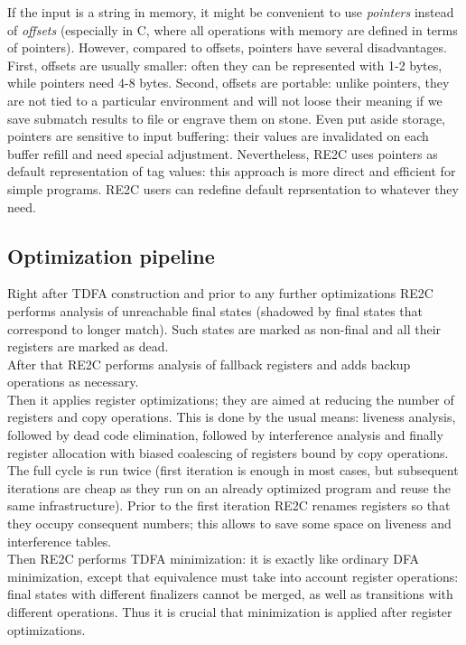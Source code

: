 \documentclass{article}
\theoremstyle{definition}
\begin{document}
\begin{multicols}{2}
If the input is a string in memory, it might be convenient to use \emph{pointers} instead of \emph{offsets}
(especially in C, where all operations with memory are defined in terms of pointers).
However, compared to offsets, pointers have several disadvantages.
First, offsets are usually smaller: often they can be represented with 1-2 bytes, while pointers need 4-8 bytes.
Second, offsets are portable: unlike pointers, they are not tied to a particular environment
and will not loose their meaning if we save submatch results to file or engrave them on stone.
Even put aside storage, pointers are sensitive to input buffering:
their values are invalidated on each buffer refill and need special adjustment.
Nevertheless, RE2C uses pointers as default representation of tag values:
this approach is more direct and efficient for simple programs.
RE2C users can redefine default reprsentation to whatever they need.

\subsection*{Optimization pipeline}

Right after TDFA construction and prior to any further optimizations
RE2C performs analysis of unreachable final states
(shadowed by final states that correspond to longer match).
Such states are marked as non-final and all their registers are marked as dead.
\\

After that RE2C performs analysis of fallback registers and adds backup operations as necessary.
\\

Then it applies register optimizations;
they are aimed at reducing the number of registers and copy operations.
This is done by the usual means:
liveness analysis, followed by dead code elimination,
followed by interference analysis and finally register allocation
with biased coalescing of registers bound by copy operations.
The full cycle is run twice (first iteration is enough in most cases,
but subsequent iterations are cheap as they run on an already optimized program and reuse the same infrastructure).
Prior to the first iteration RE2C renames registers so that they occupy consequent numbers;
this allows to save some space on liveness and interference tables.
\\

Then RE2C performs TDFA minimization:
it is exactly like ordinary DFA minimization, except that
equivalence must take into account register operations:
final states with different finalizers cannot be merged, as well as transitions with different operations.
Thus it is crucial that minimization is applied after register optimizations.
\\


\end{multicols}
\end{document}
